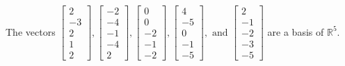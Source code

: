\begin{exercise}
\begin{exerciseStatement}
  \end{exerciseStatement}
  \begin{exerciseAnswer}
   The vectors \(\left[\begin{array}{r}
2 \\
-3 \\
2 \\
1 \\
2
\end{array}\right] , \left[\begin{array}{r}
-2 \\
-4 \\
-1 \\
-4 \\
2
\end{array}\right] , \left[\begin{array}{r}
0 \\
0 \\
-2 \\
-1 \\
-2
\end{array}\right] , \left[\begin{array}{r}
4 \\
-5 \\
0 \\
-1 \\
-5
\end{array}\right] , \text{ and } \left[\begin{array}{r}
2 \\
-1 \\
-2 \\
-3 \\
-5
\end{array}\right]\) 
  	 are  a basis of \(\mathbb{R}^5\).
  


  \end{exerciseAnswer}
\end{exercise}